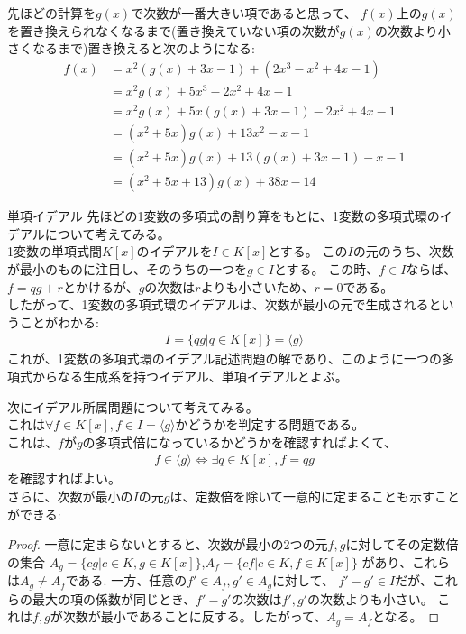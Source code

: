 \begin{frame}
	先ほどの計算を$g(x)$で次数が一番大きい項であると思って、
	$f(x)$上の$g(x)$を置き換えられなくなるまで(置き換えていない項の次数が$g(x)$の次数より小さくなるまで)置き換えると次のようになる:
	\begin{align*}
		f(x) & = x^2 (g(x) + 3x - 1) + (2x^3 - x^2 + 4x - 1)   \\
		     & = x^2 g(x) + 5x^3 - 2x^2  + 4x - 1              \\
		     & = x^2 g(x) + 5x (g(x) + 3x - 1) - 2x^2 + 4x - 1 \\
		     & = (x^2 + 5x) g(x) + 13x^2 - x - 1               \\
		     & = (x^2 + 5x) g(x) + 13(g(x) + 3x - 1) - x - 1   \\
		     & = (x^2 + 5x + 13) g(x) + 38x - 14
	\end{align*}
\end{frame}

\begin{frame}{単項イデアル}
	先ほどの1変数の多項式の割り算をもとに、1変数の多項式環のイデアルについて考えてみる。 \\
	1変数の単項式間$K[x]$のイデアルを$I \in K[x]$とする。
	この$I$の元のうち、次数が最小のものに注目し、そのうちの一つを$g \in I$とする。
	この時、$f \in I$ならば、$f = qg + r$とかけるが、$g$の次数は$r$よりも小さいため、$r = 0$である。\\
	したがって、1変数の多項式環のイデアルは、次数が最小の元で生成されるということがわかる:
	\begin{align*}
		I = \{q g | q \in K[x] \} = \langle g \rangle
	\end{align*}
	これが、1変数の多項式環のイデアル記述問題の解であり、このように一つの多項式からなる生成系を持つイデアル、単項イデアルとよぶ。
\end{frame}

\begin{frame}
	次にイデアル所属問題について考えてみる。\\
	これは$\forall f \in K[x], f \in I = \langle g \rangle$かどうかを判定する問題である。\\
	これは、$f$が$g$の多項式倍になっているかどうかを確認すればよくて、
	\begin{align}
		f \in \langle g \rangle \Leftrightarrow \exists q \in K[x], f = qg
	\end{align}
	を確認すればよい。\\

	さらに、次数が最小の$I$の元$g$は、定数倍を除いて一意的に定まることも示すことができる:
	\begin{proof}
		一意に定まらないとすると、次数が最小の2つの元$f,g$に対してその定数倍の集合
		$A_g=\{cg |c \in K, g \in K[x]\}$,$A_f=\{c f | c \in K, f \in K[x]\}$
		があり、これらは$A_g \neq A_f$である.
		一方、任意の$f' \in A_f, g' \in A_g$に対して、
		$f'-g' \in I$だが、これらの最大の項の係数が同じとき、$f'-g'$の次数は$f',g'$の次数よりも小さい。
		これは$f,g$が次数が最小であることに反する。したがって、$A_g = A_f$となる。
	\end{proof}
\end{frame}
